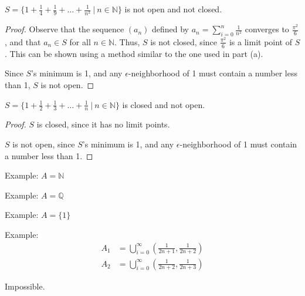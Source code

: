 \documentclass[12pt]{article}
\begin{document}
\medskip
{} $S = \{1 + \frac14 + \frac19 + \hdots + \frac1{n^2}~|~n\in \mathbb N\}$ is not open and not closed.
\begin{proof}
    Observe that the sequence $(a_n)$ defined by $a_n = \sum\limits_{i=0}^n\frac1{n^2}$ converges to $\frac{\pi^2}6$, and that $a_n \in S$ for all $n \in \mathbb N$. Thus, $S$ is not closed, since $\frac{\pi^2}6$ is a limit point of $S$. This can be shown using a method similar to the one used in part (a).

    Since $S$'s minimum is 1, and any $\epsilon$-neighborhood of 1 must contain a number less than 1, $S$ is not open.
\end{proof}

\medskip
{} $S = \{1 + \frac12 + \frac13 + \hdots + \frac1{n}~|~n\in \mathbb N\}$ is closed and not open.
\begin{proof}
    $S$ is closed, since it has no limit points.

    $S$ is not open, since $S$'s minimum is 1, and any $\epsilon$-neighborhood of 1 must contain a number less than 1.
\end{proof}

\newpage
{}

\medskip
{} Example: $A = \mathbb N$

    

\medskip
{} Example: $A = \mathbb Q$

    

\medskip
{} Example: $A = \{1\}$



\medskip
{} Example:
\begin{align*}
    A_1 &= \bigcup_{i=0}^\infty \left(\frac1{2n+1}, \frac1{2n+2}\right) \\
    A_2 &= \bigcup_{i=0}^\infty \left(\frac1{2n+2}, \frac1{2n+3}\right)
\end{align*}


\medskip
{} Impossible.
\end{document}
